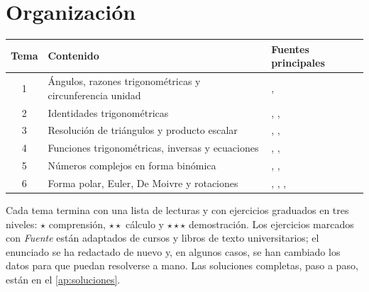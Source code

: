 \documentclass[11pt,a4paper,twoside,openany]{book}
\begin{document}
\section*{Organización}
\begin{center}
\small
\begin{tabular}{@{}clp{4.2cm}@{}}
\toprule
Tema & Contenido & Fuentes principales \\
\midrule
1 & Ángulos, razones trigonométricas y circunferencia unidad & \cite{osat}, \cite{stewart} \\
2 & Identidades trigonométricas & \cite{osat}, \cite{osprecalc}, \cite{mit1803} \\
3 & Resolución de triángulos y producto escalar & \cite{osat}, \cite{stewart}, \cite{strang} \\
4 & Funciones trigonométricas, inversas y ecuaciones & \cite{osat}, \cite{osprecalc}, \cite{vaswani} \\
5 & Números complejos en forma binómica & \cite{osat}, \cite{mit1803}, \cite{cambvm} \\
6 & Forma polar, Euler, De Moivre y rotaciones & \cite{mit1803}, \cite{needham}, \cite{cambvm}, \cite{roformer} \\
\bottomrule
\end{tabular}
\end{center}

Cada tema termina con una lista de lecturas y con ejercicios graduados en tres niveles: $\star$ comprensión, $\star\star$ cálculo y $\star\star\star$ demostración. Los ejercicios marcados con \emph{Fuente} están adaptados de cursos y libros de texto universitarios; el enunciado se ha redactado de nuevo y, en algunos casos, se han cambiado los datos para que puedan resolverse a mano. Las soluciones completas, paso a paso, están en el \cref{ap:soluciones}.
\end{document}
